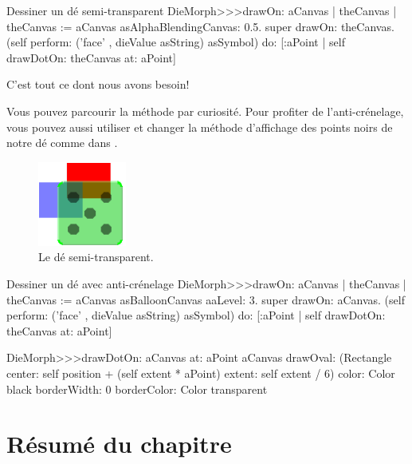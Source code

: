 \documentclass[a4paper,10pt,twoside]{book}
\begin{document}

\begin{method}{Dessiner un d\'e semi-transparent}
DieMorph>>>drawOn: aCanvas
	| theCanvas |
	theCanvas := aCanvas asAlphaBlendingCanvas: 0.5.
	super drawOn: theCanvas.
	(self perform: ('face' , dieValue asString) asSymbol)
		do: [:aPoint | self drawDotOn: theCanvas at: aPoint]
\end{method}
\noindent

C'est tout ce dont nous avons besoin! 

Vous pouvez parcourir la m\'ethode
 par curiosit\'e.
Pour profiter de l'anti-cr\'enelage, vous pouvez aussi utiliser
 et changer la m\'ethode d'affichage des points
noirs de notre d\'e comme dans .

\begin{figure}[ht]
	\centerline{\includegraphics[scale=0.7]{multiMorphs}}
	\caption{Le d\'e semi-transparent.\label{fig:multiMorphs}}
\end{figure}

\begin{methods}[aadie]{Dessiner un d\'e avec anti-cr\'enelage}
DieMorph>>>drawOn: aCanvas
	| theCanvas |
	theCanvas := aCanvas asBalloonCanvas aaLevel: 3.
	super drawOn: aCanvas.
	(self perform: ('face' , dieValue asString) asSymbol)
		do: [:aPoint | self drawDotOn: theCanvas at: aPoint]

DieMorph>>>drawDotOn: aCanvas at: aPoint
	aCanvas
		drawOval: (Rectangle
			center: self position + (self extent * aPoint)
			extent: self extent / 6)
		color: Color black
		borderWidth: 0
		borderColor: Color transparent
\end{methods}

\section{R\'esum\'e du chapitre}
\end{document}
